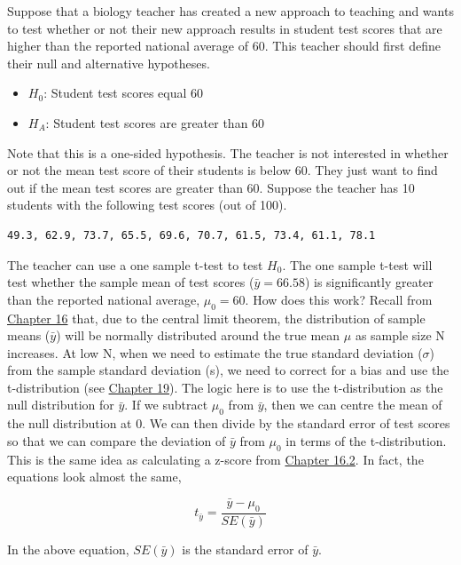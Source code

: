 \documentclass[
]{scrbook}
\providecommand{\tightlist}{%
  \setlength{\itemsep}{0pt}\setlength{\parskip}{0pt}}
\begin{document}
Suppose that a biology teacher has created a new approach to teaching and wants to test whether or not their new approach results in student test scores that are higher than the reported national average of 60.
This teacher should first define their null and alternative hypotheses.

\begin{itemize}
\tightlist
\item
  \(H_{0}\): Student test scores equal 60
\item
  \(H_{A}\): Student test scores are greater than 60
\end{itemize}

Note that this is a one-sided hypothesis.
The teacher is not interested in whether or not the mean test score of their students is below 60.
They just want to find out if the mean test scores are greater than 60.
Suppose the teacher has 10 students with the following test scores (out of 100).

\begin{verbatim}
49.3, 62.9, 73.7, 65.5, 69.6, 70.7, 61.5, 73.4, 61.1, 78.1
\end{verbatim}

The teacher can use a one sample t-test to test \(H_{0}\).
The one sample t-test will test whether the sample mean of test scores (\(\bar{y} = 66.58\)) is significantly greater than the reported national average, \(\mu_{0} = 60\).
How does this work?
Recall from \protect\hyperlink{Chapter_16}{Chapter 16} that, due to the central limit theorem, the distribution of sample means (\(\bar{y}\)) will be normally distributed around the true mean \(\mu\) as sample size N increases.
At low N, when we need to estimate the true standard deviation (\(\sigma\)) from the sample standard deviation (s), we need to correct for a bias and use the t-distribution (see \protect\hyperlink{Chapter_19}{Chapter 19}).
The logic here is to use the t-distribution as the null distribution for \(\bar{y}\).
If we subtract \(\mu_{0}\) from \(\bar{y}\), then we can centre the mean of the null distribution at 0.
We can then divide by the standard error of test scores so that we can compare the deviation of \(\bar{y}\) from \(\mu_{0}\) in terms of the t-distribution.
This is the same idea as calculating a z-score from \protect\hyperlink{probability-and-z-scores}{Chapter 16.2}.
In fact, the equations look almost the same,

\[t_{\bar{y}} = \frac{\bar{y} - \mu_{0}}{SE(\bar{y})}\]

In the above equation, \(SE(\bar{y})\) is the standard error of \(\bar{y}\).
\end{document}
